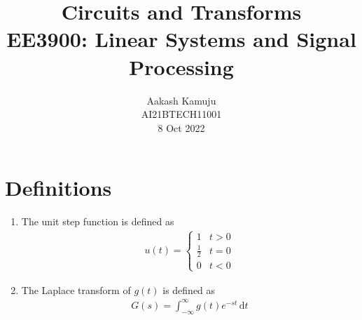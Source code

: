 \documentclass[journal,12pt,twocolumn]{IEEEtran}
\title{Circuits and Transforms \\ \Large EE3900: Linear Systems and Signal Processing \\ }
\author{Aakash Kamuju\\ \normalsize AI21BTECH11001 \\ \vspace*{20pt} \normalsize 8 Oct 2022}
\providecommand{\der}[1]{\mathrm{d} #1}
\numberwithin{equation}{section}
\numberwithin{figure}{section}
\renewcommand\thesection{\arabic{section}}
\begin{document}
	\maketitle

	\section{Definitions}
	\begin{enumerate}[label=\thesection.\arabic*,ref=\thesection.\theenumi]
	\item The unit step function is defined as
	\begin{align}
		u(t) =
		\begin{cases}
			1 & t > 0 \\
			\frac{1}{2} & t = 0 \\
			0 & t < 0
		\end{cases}
	\end{align}
		
	\item The Laplace transform of $g(t)$ is defined as 
	\begin{align}
		G(s) = \int_{-\infty}^{\infty} g(t) e^{-st}\, \der{t}
	\end{align}
	\end{enumerate}
	
\end{document}
